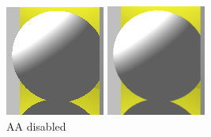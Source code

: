 \begin{figure}[H]
    \centering
    \includegraphics[width=\linewidth]{img/antialiasing/no_aa.png}
    \caption{AA disabled}
\endminipage\hfill
{}
    \centering
    \includegraphics[width=\linewidth]{img/antialiasing/super8x.png}

\end{figure}

